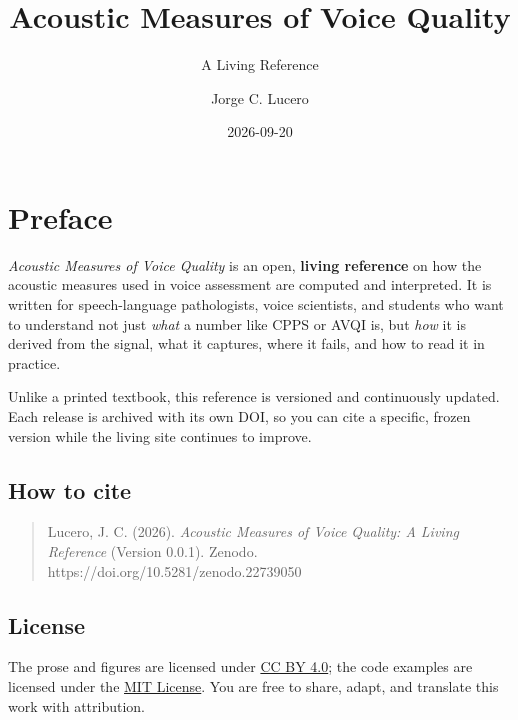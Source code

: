 \documentclass[
  english,
  letterpaper,
]{scrbook}
\title{Acoustic Measures of Voice Quality}
\subtitle{A Living Reference}
\author{Jorge C. Lucero}
\date{2026-09-20}
\renewcommand*\contentsname{Table of contents}
\newcommand\contentsname{Table of contents}
\begin{document}
\frontmatter
\maketitle

\renewcommand*\contentsname{Table of contents}
{
\setcounter{tocdepth}{2}
\tableofcontents
}

\mainmatter
{}

\chapter*{Preface}\label{preface}


\emph{Acoustic Measures of Voice Quality} is an open, \textbf{living
reference} on how the acoustic measures used in voice assessment are
computed and interpreted. It is written for speech-language
pathologists, voice scientists, and students who want to understand not
just \emph{what} a number like CPPS or AVQI is, but \emph{how} it is
derived from the signal, what it captures, where it fails, and how to
read it in practice.

Unlike a printed textbook, this reference is versioned and continuously
updated. Each release is archived with its own DOI, so you can cite a
specific, frozen version while the living site continues to improve.

\section*{How to cite}\label{how-to-cite}


\begin{quote}
Lucero, J. C. (2026). \emph{Acoustic Measures of Voice Quality: A Living
Reference} (Version 0.0.1). Zenodo.
https://doi.org/10.5281/zenodo.22739050
\end{quote}

\section*{License}\label{license}


The prose and figures are licensed under
\href{https://creativecommons.org/licenses/by/4.0/}{CC BY 4.0}; the code
examples are licensed under the
\href{https://opensource.org/licenses/MIT}{MIT License}. You are free to
share, adapt, and translate this work with attribution.
\end{document}
